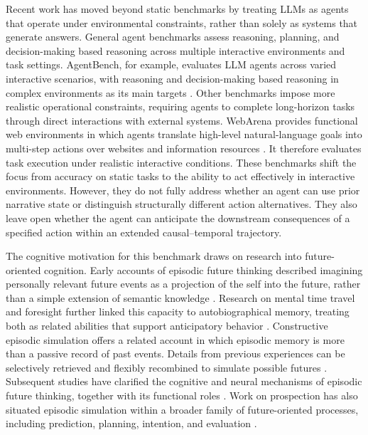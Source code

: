 \documentclass[pdflatex,sn-mathphys-num]{sn-jnl}%
\theoremstyle{thmstyleone}%
\theoremstyle{thmstyletwo}%
\theoremstyle{thmstylethree}%
\begin{document}
Recent work has moved beyond static benchmarks by treating LLMs as agents that operate under environmental constraints, rather than solely as systems that generate answers. General agent benchmarks assess reasoning, planning, and decision-making based reasoning across multiple interactive environments and task settings. AgentBench, for example, evaluates LLM agents across varied interactive scenarios, with reasoning and decision-making based reasoning in complex environments as its main targets \cite{liu2023agentbench}. Other benchmarks impose more realistic operational constraints, requiring agents to complete long-horizon tasks through direct interactions with external systems. WebArena provides functional web environments in which agents translate high-level natural-language goals into multi-step actions over websites and information resources \cite{zhou2023webarena}. It therefore evaluates task execution under realistic interactive conditions. These benchmarks shift the focus from accuracy on static tasks to the ability to act effectively in interactive environments. However, they do not fully address whether an agent can use prior narrative state or distinguish structurally different action alternatives. They also leave open whether the agent can anticipate the downstream consequences of a specified action within an extended causal--temporal trajectory.

The cognitive motivation for this benchmark draws on research into future-oriented cognition. Early accounts of episodic future thinking described imagining personally relevant future events as a projection of the self into the future, rather than a simple extension of semantic knowledge \cite{atance2001episodic}. Research on mental time travel and foresight further linked this capacity to autobiographical memory, treating both as related abilities that support anticipatory behavior \cite{suddendorf2007evolution}. Constructive episodic simulation offers a related account in which episodic memory is more than a passive record of past events. Details from previous experiences can be selectively retrieved and flexibly recombined to simulate possible futures \cite{schacter2007cognitive}. Subsequent studies have clarified the cognitive and neural mechanisms of episodic future thinking, together with its functional roles \cite{schacter2017episodic}. Work on prospection has also situated episodic simulation within a broader family of future-oriented processes, including prediction, planning, intention, and evaluation \cite{szpunar2014taxonomy}.
\end{document}
